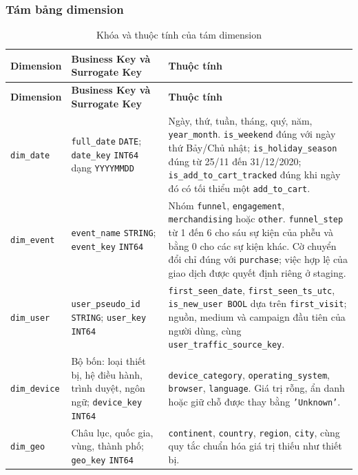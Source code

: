 \subsubsection{Tám bảng dimension}

\begin{xltabular}{\textwidth}{>{\raggedright\arraybackslash}p{3.5cm} >{\raggedright\arraybackslash}p{4.5cm} >{\raggedright\arraybackslash}X}
\caption{Khóa và thuộc tính của tám dimension}
\label{tab:dimensions} \\
\hline
\textbf{Dimension} & \textbf{Business Key và Surrogate Key} & \textbf{Thuộc tính} \\
\hline
\endfirsthead
\hline
\textbf{Dimension} & \textbf{Business Key và Surrogate Key} & \textbf{Thuộc tính} \\
\hline
\endhead
\hline
\endfoot
\hline
\endlastfoot

\texttt{dim\_date}
& \texttt{full\_date} \texttt{DATE}; \texttt{date\_key} \texttt{INT64} dạng \texttt{YYYYMMDD}
& Ngày, thứ, tuần, tháng, quý, năm, \texttt{year\_month}. \texttt{is\_weekend} đúng với ngày thứ Bảy/Chủ nhật; \texttt{is\_holiday\_season} đúng từ 25/11 đến 31/12/2020; \texttt{is\_add\_to\_cart\_tracked} đúng khi ngày đó có tối thiểu một \texttt{add\_to\_cart}. \\

\texttt{dim\_event}
& \texttt{event\_name} \texttt{STRING}; \texttt{event\_key} \texttt{INT64}
& Nhóm \texttt{funnel}, \texttt{engagement}, \texttt{merchandising} hoặc \texttt{other}. \texttt{funnel\_step} từ 1 đến 6 cho sáu sự kiện của phễu và bằng 0 cho các sự kiện khác. Cờ chuyển đổi chỉ đúng với \texttt{purchase}; việc hợp lệ của giao dịch được quyết định riêng ở staging. \\

\texttt{dim\_user}
& \texttt{user\_pseudo\_id} \texttt{STRING}; \texttt{user\_key} \texttt{INT64}
& \texttt{first\_seen\_date}, \texttt{first\_seen\_ts\_utc}, \texttt{is\_new\_user BOOL} dựa trên \texttt{first\_visit}; nguồn, medium và campaign đầu tiên của người dùng, cùng \texttt{user\_traffic\_source\_key}. \\

\texttt{dim\_device}
& Bộ bốn: loại thiết bị, hệ điều hành, trình duyệt, ngôn ngữ; \texttt{device\_key} \texttt{INT64}
& \texttt{device\_category}, \texttt{operating\_system}, \texttt{browser}, \texttt{language}. Giá trị rỗng, ẩn danh hoặc giữ chỗ được thay bằng \texttt{'Unknown'}. \\

\texttt{dim\_geo}
& Châu lục, quốc gia, vùng, thành phố; \texttt{geo\_key} \texttt{INT64}
& \texttt{continent}, \texttt{country}, \texttt{region}, \texttt{city}, cùng quy tắc chuẩn hóa giá trị thiếu như thiết bị. \\


\end{xltabular}
